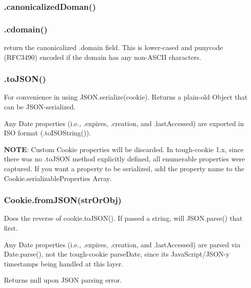 \subsubsection*{{\ttfamily .canonicalized\+Doman()}}

\subsubsection*{{\ttfamily .cdomain()}}

return the canonicalized {\ttfamily .domain} field. This is lower-\/cased and punycode (R\+F\+C3490) encoded if the domain has any non-\/\+A\+S\+C\+II characters.

\subsubsection*{{\ttfamily .to\+J\+S\+O\+N()}}

For convenience in using {\ttfamily J\+S\+O\+N.\+serialize(cookie)}. Returns a plain-\/old {\ttfamily Object} that can be J\+S\+O\+N-\/serialized.

Any {\ttfamily Date} properties (i.\+e., {\ttfamily .expires}, {\ttfamily .creation}, and {\ttfamily .last\+Accessed}) are exported in I\+SO format ({\ttfamily .to\+I\+S\+O\+String()}).

{\bfseries N\+O\+TE}\+: Custom {\ttfamily Cookie} properties will be discarded. In tough-\/cookie 1.\+x, since there was no {\ttfamily .to\+J\+S\+ON} method explicitly defined, all enumerable properties were captured. If you want a property to be serialized, add the property name to the {\ttfamily Cookie.\+serializable\+Properties} Array.

\subsubsection*{{\ttfamily Cookie.\+from\+J\+S\+O\+N(str\+Or\+Obj)}}

Does the reverse of {\ttfamily cookie.\+to\+J\+S\+O\+N()}. If passed a string, will {\ttfamily J\+S\+O\+N.\+parse()} that first.

Any {\ttfamily Date} properties (i.\+e., {\ttfamily .expires}, {\ttfamily .creation}, and {\ttfamily .last\+Accessed}) are parsed via {\ttfamily Date.\+parse()}, not the tough-\/cookie {\ttfamily parse\+Date}, since it\textquotesingle{}s Java\+Script/\+J\+S\+O\+N-\/y timestamps being handled at this layer.

Returns {\ttfamily null} upon J\+S\+ON parsing error.

